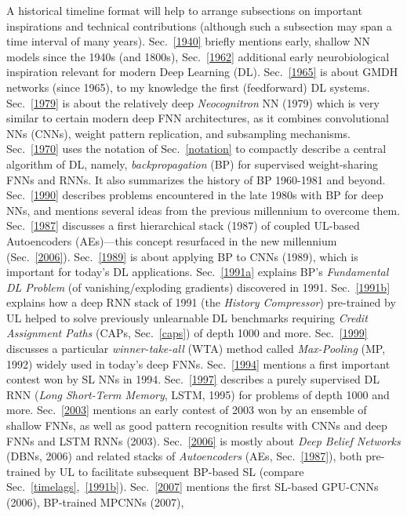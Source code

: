 \documentclass[letterpaper]{article}
\begin{document}
\begin{sloppypar}
A historical timeline format will help to arrange 
subsections on
important inspirations and technical contributions
(although such a subsection may span a time interval of many years).
Sec.~\ref{1940} briefly mentions early, shallow NN models since the 1940s (and 1800s),
Sec.~\ref{1962} additional early neurobiological inspiration relevant for modern Deep Learning (DL).
Sec.~\ref{1965} is about GMDH networks  (since 1965), 
to my knowledge the first (feedforward) DL systems.
Sec.~\ref{1979} is about the relatively deep {\em Neocognitron} NN (1979)
which is very similar to certain modern deep FNN architectures, as it
combines convolutional NNs (CNNs), weight pattern replication, and subsampling mechanisms.
Sec.~\ref{1970} uses the notation of Sec.~\ref{notation} to compactly 
describe a central algorithm of DL, namely,
{\em backpropagation} (BP) for 
supervised weight-sharing FNNs and RNNs. It also summarizes
 the history of BP 1960-1981 and beyond.
Sec.~\ref{1990} describes problems encountered in the late 1980s with BP for deep NNs,
and mentions several ideas from the previous millennium  to overcome them.
Sec.~\ref{1987} discusses a first hierarchical stack (1987) of coupled UL-based Autoencoders (AEs)---this concept
resurfaced in the
new millennium (Sec.~\ref{2006}). 
Sec.~\ref{1989} is about applying BP to CNNs (1989), which is important for today's DL applications.
Sec.~\ref{1991a} explains BP's {\em Fundamental DL Problem} (of vanishing/exploding gradients)
discovered in 1991.
Sec.~\ref{1991b} explains how a deep RNN stack of 1991 (the {\em History Compressor}) pre-trained by UL helped to solve previously unlearnable DL benchmarks 
requiring {\em Credit Assignment Paths} (CAPs, Sec.~\ref{caps}) of depth 1000 and more.
Sec.~\ref{1999} discusses a particular {\em winner-take-all} (WTA) method called {\em Max-Pooling} (MP, 1992)  widely used in today's deep FNNs.
Sec.~\ref{1994} mentions a first important contest won by SL NNs in 1994.
Sec.~\ref{1997} describes a purely supervised DL RNN ({\em Long Short-Term Memory}, LSTM, 1995) for problems of depth 1000 and more.
Sec.~\ref{2003} mentions an early contest of 2003 
won by an ensemble of shallow FNNs, as well as
good pattern recognition results with CNNs and deep FNNs and LSTM RNNs (2003). 
Sec.~\ref{2006} is mostly about {\em Deep Belief Networks} (DBNs, 2006) and related stacks of {\em  Autoencoders} (AEs, Sec.~\ref{1987}), both pre-trained by UL to facilitate subsequent BP-based SL (compare Sec.~\ref{timelags},~\ref{1991b}). 
Sec.~\ref{2007} mentions the first SL-based  GPU-CNNs (2006),  BP-trained MPCNNs (2007),

\end{sloppypar}
\end{document}

